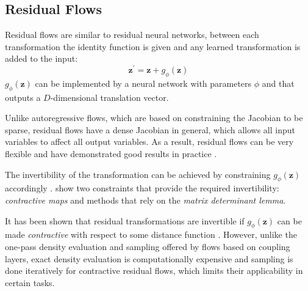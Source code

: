 \documentclass[english]{scrartcl}
\begin{document}
    \subsection{Residual Flows}
    Residual flows are similar to residual neural networks, between each transformation the identity function is given and any learned transformation is added to the input:
    \begin{equation}
        \label{eq:res_flow_eq}
        \textbf{z}^{\prime} = \textbf{z} + g_{\phi} (\textbf{z})
    \end{equation}
    $g_{\phi} (\textbf{z})$ can be implemented by a neural network with parameters $\phi$ and that outputs a $D$-dimensional translation vector.

    Unlike autoregressive flows, which are based on constraining the Jacobian to be sparse, residual flows have a dense Jacobian in general, which allows all input variables to affect all output variables.
    As a result, residual flows can be very flexible and have demonstrated good results in practice \citep{chen_residual_2020}.

    The invertibility of the transformation can be achieved by constraining $g_{\phi} (\textbf{z})$ accordingly \citep{behrmann_invertible_2019, chen_residual_2020}.
    \cite{papamakarios_normalizing_2019} show two constraints that provide the required invertibility: \textit{contractive maps} and methods that rely on the \textit{matrix determinant lemma}.

    It has been shown that residual transformations are invertible if $g_{\phi} (\textbf{z})$ can be made \textit{contractive} with respect to some distance function \citep{behrmann_invertible_2019, chen_residual_2020}.
    However, unlike the one-pass density evaluation and sampling offered by flows based on coupling layers, exact density evaluation is computationally expensive and sampling is done iteratively for contractive residual flows, which limits their applicability in certain tasks.
\end{document}
